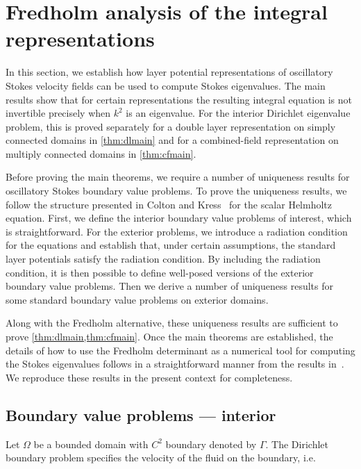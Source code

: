 \section{Fredholm analysis of the integral representations}
\label{sec:analysis}
In this section, we establish how layer potential
representations of oscillatory Stokes velocity fields
can be used to compute Stokes eigenvalues.
%
The main results show that for certain representations
the resulting integral equation is not invertible precisely
when $k^2$ is an eigenvalue.
%
For the interior Dirichlet eigenvalue problem, this is
proved separately for a double layer representation on
simply connected domains in \cref{thm:dlmain} and
for a combined-field representation on multiply connected
domains in \cref{thm:cfmain}.
%

Before proving the main theorems, we require a number
of uniqueness results for oscillatory Stokes boundary
value problems.
%
To prove the uniqueness results, we follow the 
structure presented in Colton and Kress~\cite[Ch. 3]{colton1983integral}
for the scalar Helmholtz equation.
%
First, we define the interior boundary value problems
of interest, which is straightforward.
%
For the exterior problems, we introduce a radiation condition
for the equations and establish that, under certain assumptions,
the standard layer potentials satisfy the radiation condition.
%
By including the radiation condition, it is then
possible to define well-posed versions of the
exterior boundary value problems.
%
Then we derive a number of uniqueness
results for some standard boundary value problems
on exterior domains.


Along with the Fredholm alternative, these uniqueness
results are sufficient to prove
\cref{thm:dlmain,thm:cfmain}.
%
Once the main theorems are established,
the details of how to use the Fredholm determinant
as a numerical tool for computing the Stokes eigenvalues
follows in a straightforward manner from the results
in~\cite{zhao2015robust}.
%
We reproduce these results in the present
context for completeness.

\subsection{Boundary value problems --- interior}

Let $\Omega$ be a bounded domain with $C^2$ boundary
denoted by $\Gamma$.
The Dirichlet boundary problem specifies the
velocity of the fluid on the boundary, i.e.

